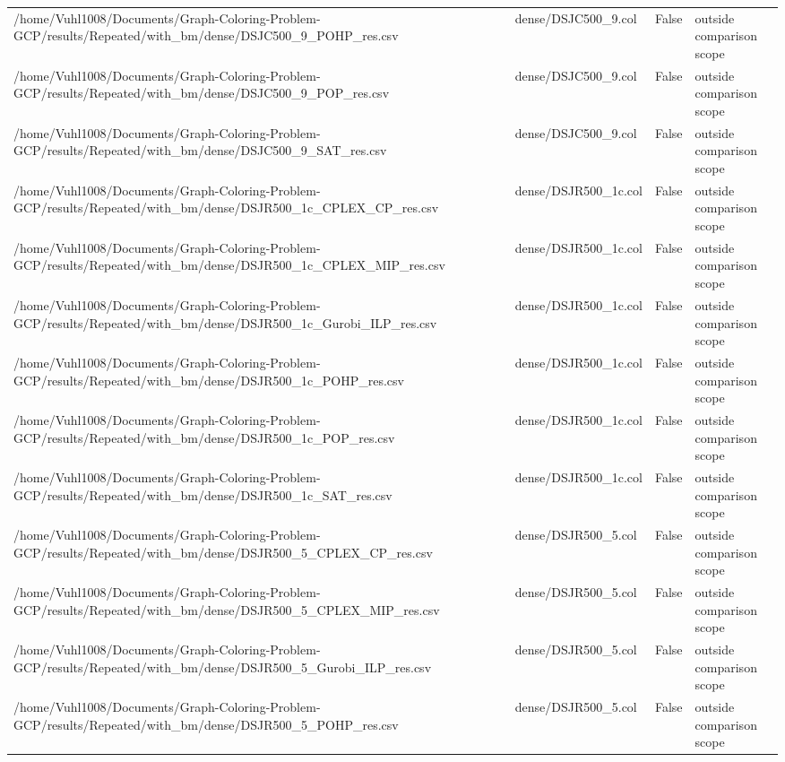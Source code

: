\begin{table}[htbp]
\begin{tabular}{llll}
/home/Vuhl1008/Documents/Graph-Coloring-Problem-GCP/results/Repeated/with\_bm/dense/DSJC500\_9\_POHP\_res.csv & dense/DSJC500\_9.col & False & outside comparison scope \\
/home/Vuhl1008/Documents/Graph-Coloring-Problem-GCP/results/Repeated/with\_bm/dense/DSJC500\_9\_POP\_res.csv & dense/DSJC500\_9.col & False & outside comparison scope \\
/home/Vuhl1008/Documents/Graph-Coloring-Problem-GCP/results/Repeated/with\_bm/dense/DSJC500\_9\_SAT\_res.csv & dense/DSJC500\_9.col & False & outside comparison scope \\
/home/Vuhl1008/Documents/Graph-Coloring-Problem-GCP/results/Repeated/with\_bm/dense/DSJR500\_1c\_CPLEX\_CP\_res.csv & dense/DSJR500\_1c.col & False & outside comparison scope \\
/home/Vuhl1008/Documents/Graph-Coloring-Problem-GCP/results/Repeated/with\_bm/dense/DSJR500\_1c\_CPLEX\_MIP\_res.csv & dense/DSJR500\_1c.col & False & outside comparison scope \\
/home/Vuhl1008/Documents/Graph-Coloring-Problem-GCP/results/Repeated/with\_bm/dense/DSJR500\_1c\_Gurobi\_ILP\_res.csv & dense/DSJR500\_1c.col & False & outside comparison scope \\
/home/Vuhl1008/Documents/Graph-Coloring-Problem-GCP/results/Repeated/with\_bm/dense/DSJR500\_1c\_POHP\_res.csv & dense/DSJR500\_1c.col & False & outside comparison scope \\
/home/Vuhl1008/Documents/Graph-Coloring-Problem-GCP/results/Repeated/with\_bm/dense/DSJR500\_1c\_POP\_res.csv & dense/DSJR500\_1c.col & False & outside comparison scope \\
/home/Vuhl1008/Documents/Graph-Coloring-Problem-GCP/results/Repeated/with\_bm/dense/DSJR500\_1c\_SAT\_res.csv & dense/DSJR500\_1c.col & False & outside comparison scope \\
/home/Vuhl1008/Documents/Graph-Coloring-Problem-GCP/results/Repeated/with\_bm/dense/DSJR500\_5\_CPLEX\_CP\_res.csv & dense/DSJR500\_5.col & False & outside comparison scope \\
/home/Vuhl1008/Documents/Graph-Coloring-Problem-GCP/results/Repeated/with\_bm/dense/DSJR500\_5\_CPLEX\_MIP\_res.csv & dense/DSJR500\_5.col & False & outside comparison scope \\
/home/Vuhl1008/Documents/Graph-Coloring-Problem-GCP/results/Repeated/with\_bm/dense/DSJR500\_5\_Gurobi\_ILP\_res.csv & dense/DSJR500\_5.col & False & outside comparison scope \\
/home/Vuhl1008/Documents/Graph-Coloring-Problem-GCP/results/Repeated/with\_bm/dense/DSJR500\_5\_POHP\_res.csv & dense/DSJR500\_5.col & False & outside comparison scope \\

\end{tabular}
\end{table}
